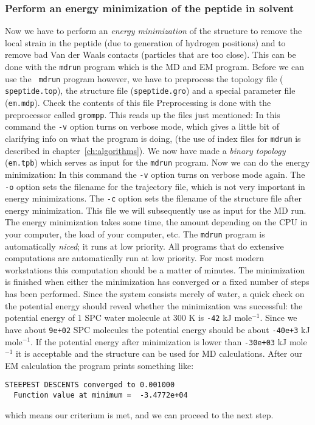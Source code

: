 \subsubsection{Perform an energy minimization of the peptide in solvent}
Now we have to perform an {\em energy minimization} of the structure
to remove the local strain in the peptide (due to generation of
hydrogen positions) and to remove bad Van der Waals contacts
(particles that are too close). This can be done with the {\tt mdrun}
program which is the MD and EM program. Before we can use the {\tt
mdrun} program however, we have to preprocess the topology file ({\tt
speptide.top}), the structure file ({\tt speptide.gro}) and a special
parameter file ({\tt em.mdp}). Check the contents of this file
 Preprocessing is done with the {\gromacs}
preprocessor called {\tt grompp}. This reads up the files just
mentioned: 
In this command the {\tt -v} option turns on verbose mode, which gives
a little bit of clarifying info on what the program is doing, 
(the use of index files for {\tt mdrun} is described in 
chapter~\ref{ch:algorithms}). 
We now have made a
{\em binary topology} ({\tt em.tpb}) which serves as input for the
{\tt mdrun} program. Now we can do the energy minimization: 
In this command the {\tt -v} option turns on verbose mode again.
The {\tt -o} option sets the filename for the trajectory file,
which is not very important in energy minimizations. The {\tt -c}
option sets the filename of the structure file after energy
minimization. This file we will subsequently use as input
for the MD run.
The energy minimization takes some time, the amount
depending on the CPU in your computer, the
load of your computer, etc. The {\tt mdrun} program is
automatically {\em niced}; it runs at low priority. All {\gromacs}
programs that do extensive computations are automatically run
at low priority. For most modern workstations this computation
should be a matter of minutes. The minimization is finished when
either the minimization has converged or
a fixed number of steps has been performed.
Since the system consists merely of water, a quick check on the
potential energy should reveal whether the minimization was 
successful: the potential energy of 1 SPC water molecule at 300 K
is {\tt -42} kJ mole$^{-1}$. Since we have about {\tt 9e+02} SPC
molecules the potential energy should be about {\tt-40e+3} kJ
mole$^{-1}$. If the potential energy after minimization is lower than
{\tt -30e+03} kJ mole$^{-1}$ it is acceptable and the structure can be
used for MD calculations. 
After our EM calculation the program prints something like:
\begin{verbatim}
STEEPEST DESCENTS converged to 0.001000 
  Function value at minimum =  -3.4772e+04
\end{verbatim}
which means our criterium is met, and we can proceed to the next step.

